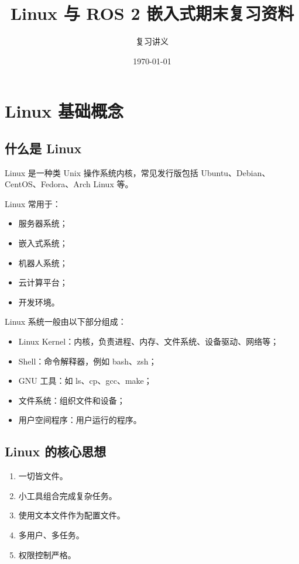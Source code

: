 \documentclass[UTF8,a4paper,12pt]{ctexart}
\title{\Huge Linux 与 ROS 2 嵌入式期末复习资料}
\author{复习讲义}
\date{\today}
\begin{document}
\maketitle
\tableofcontents
\newpage

\section{Linux 基础概念}

\subsection{什么是 Linux}

Linux 是一种类 Unix 操作系统内核，常见发行版包括 Ubuntu、Debian、CentOS、Fedora、Arch Linux 等。

Linux 常用于：
\begin{itemize}
    \item 服务器系统；
    \item 嵌入式系统；
    \item 机器人系统；
    \item 云计算平台；
    \item 开发环境。
\end{itemize}

Linux 系统一般由以下部分组成：
\begin{itemize}
    \item Linux Kernel：内核，负责进程、内存、文件系统、设备驱动、网络等；
    \item Shell：命令解释器，例如 bash、zsh；
    \item GNU 工具：如 ls、cp、gcc、make；
    \item 文件系统：组织文件和设备；
    \item 用户空间程序：用户运行的程序。
\end{itemize}

\subsection{Linux 的核心思想}

\begin{enumerate}
    \item 一切皆文件。
    \item 小工具组合完成复杂任务。
    \item 使用文本文件作为配置文件。
    \item 多用户、多任务。
    \item 权限控制严格。
\end{enumerate}
\end{document}
